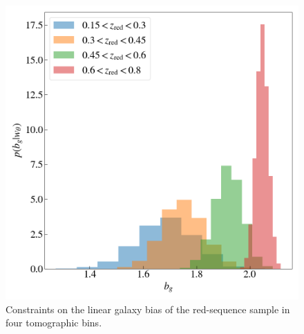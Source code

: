 \documentclass[fleqn,usenatbib,useAMS]{mnras}
\begin{document}
\begin{figure}
\includegraphics[width=\columnwidth]{figures_tmp/b_estimate.png}
\caption{\label{fig:xi} Constraints on the linear galaxy bias of the red-sequence sample in four tomographic bins.} 
\end{figure}










\appendix


\bsp	%
\label{lastpage}
\end{document}
